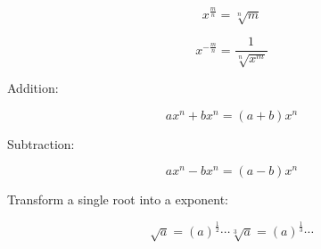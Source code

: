 \begin{definition}
    \begin{equation}
        x^{\frac{m}{n}} = \sqrt[n]{m} \label{eq-58}
    \end{equation}

    \begin{equation}
        x^{-\frac{m}{n}} = \frac{1}{\sqrt[n]{x^m}} \label{eq-59}
    \end{equation}

    Addition: %

    \begin{equation}
        ax^n + bx^n = (a+b)x^n \label{eq-60}
    \end{equation}

    Subtraction: 

    \begin{equation}
        ax^n - bx^n = (a-b)x^n \label{eq-61}
    \end{equation}

    Transform a single root into a exponent:

    \begin{equation}
        \sqrt{a} = (a)^{\frac{1}{2}} \cdots \sqrt[3]{a} = (a)^{\frac{1}{3}} \cdots \label{eq-62}
    \end{equation}

\end{definition}      